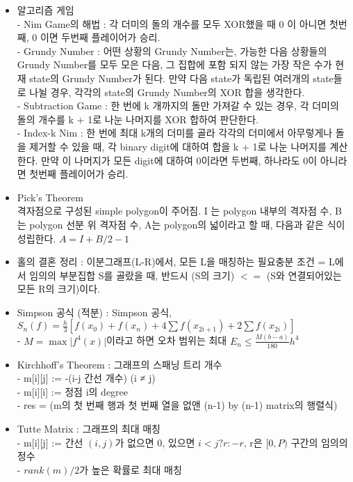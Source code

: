 \documentclass[landscape, 8pt, a4paper, oneside, twocolumn]{extarticle}
\begin{document}
\begin{itemize}
\item 알고리즘 게임\\
- Nim Game의 해법 : 각 더미의 돌의 개수를 모두 XOR했을 때 0 이 아니면 첫번째, 0 이면 두번째 플레이어가 승리.\\
- Grundy Number : 어떤 상황의 Grundy Number는, 가능한 다음 상황들의 Grundy Number를 모두 모은 다음, 그 집합에 포함 되지 않는 가장 작은 수가 현재 state의 Grundy Number가 된다. 만약 다음 state가 독립된 여러개의 state들로 나뉠 경우, 각각의 state의 Grundy Number의 XOR 합을 생각한다.\\
- Subtraction Game : 한 번에 k 개까지의 돌만 가져갈 수 있는 경우, 각 더미의 돌의 개수를 k + 1로 나눈 나머지를 XOR 합하여 판단한다.\\
- Index-k Nim : 한 번에 최대 k개의 더미를 골라 각각의 더미에서 아무렇게나 돌을 제거할 수 있을 때, 각 binary digit에 대하여 합을 k + 1로 나눈 나머지를 계산한다. 만약 이 나머지가 모든 digit에 대하여 0이라면 두번째, 하나라도 0이 아니라면 첫번째 플레이어가 승리.

\item Pick’s Theorem\\
격자점으로 구성된 simple polygon이 주어짐. I 는 polygon 내부의 격자점 수, B 는 polygon 선분 위 격자점 수, A는 polygon의 넓이라고 할 때, 다음과 같은 식이 성립한다. $A=I+B/2-1$

\item 홀의 결혼 정리 : 이분그래프(L-R)에서, 모든 L을 매칭하는 필요충분 조건 = L에서 임의의 부분집합 S를 골랐을 때, 반드시 (S의 크기) $<=$ (S와 연결되어있는 모든 R의 크기)이다.

\item Simpson 공식 (적분) : Simpson 공식, $S_n(f) = \frac{h}{3}[f(x_0)+f(x_n)+ 4\sum f(x_{2i+1}) + 2\sum f(x_{2i})]$\\
- $M = \max \vert f^4(x) \vert$이라고 하면 오차 범위는 최대 $E_n \leq \frac{M(b-a)}{180}h^4$

\item Kirchhoff’s Theorem : 그래프의 스패닝 트리 개수\\
- m[i][j] :=  -(i-j 간선 개수) (i ≠ j)\\
- m[i][i] :=  정점 i의 degree\\
- res =  (m의 첫 번째 행과 첫 번째 열을 없앤 (n-1) by (n-1) matrix의 행렬식)

\item Tutte Matrix : 그래프의 최대 매칭\\
- m[i][j] := 간선 $(i, j)$가 없으면 0, 있으면 $i < j ? r : -r$, r은 $[0,P)$ 구간의 임의의 정수\\
- $rank(m) / 2$가 높은 확률로 최대 매칭

\end{itemize}
\end{document}
